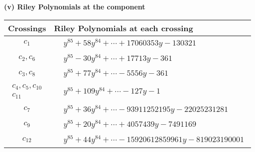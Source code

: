\documentclass[1p]{elsarticle_modified}
\theoremstyle{definition}
\begin{document}
\newpage\renewcommand{\arraystretch}{1}
\flushleft \textbf{(v) Riley Polynomials at the component}\newline \\
\begin{tabular}{m{50pt}|m{274pt}}
Crossings & \hspace{64pt}Riley Polynomials at each crossing \\
\hline $$\begin{aligned}c_{1}\end{aligned}$$&$\begin{aligned}
&y^{85}+58 y^{84}+\cdots+17060353 y-130321
\end{aligned}$\\
\hline $$\begin{aligned}c_{2},c_{6}\end{aligned}$$&$\begin{aligned}
&y^{85}-30 y^{84}+\cdots+17713 y-361
\end{aligned}$\\
\hline $$\begin{aligned}c_{3},c_{8}\end{aligned}$$&$\begin{aligned}
&y^{85}+77 y^{84}+\cdots-5556 y-361
\end{aligned}$\\
\hline $$\begin{aligned}c_{4},c_{5},c_{10}\\c_{11}\end{aligned}$$&$\begin{aligned}
&y^{85}+109 y^{84}+\cdots-127 y-1
\end{aligned}$\\
\hline $$\begin{aligned}c_{7}\end{aligned}$$&$\begin{aligned}
&y^{85}+36 y^{84}+\cdots-93911252195 y-22025231281
\end{aligned}$\\
\hline $$\begin{aligned}c_{9}\end{aligned}$$&$\begin{aligned}
&y^{85}+20 y^{84}+\cdots+4057439 y-7491169
\end{aligned}$\\
\hline $$\begin{aligned}c_{12}\end{aligned}$$&$\begin{aligned}
&y^{85}+44 y^{84}+\cdots-15920612859961 y-819023190001
\end{aligned}$\\
\hline
\end{tabular}\\~\\
\end{document}
